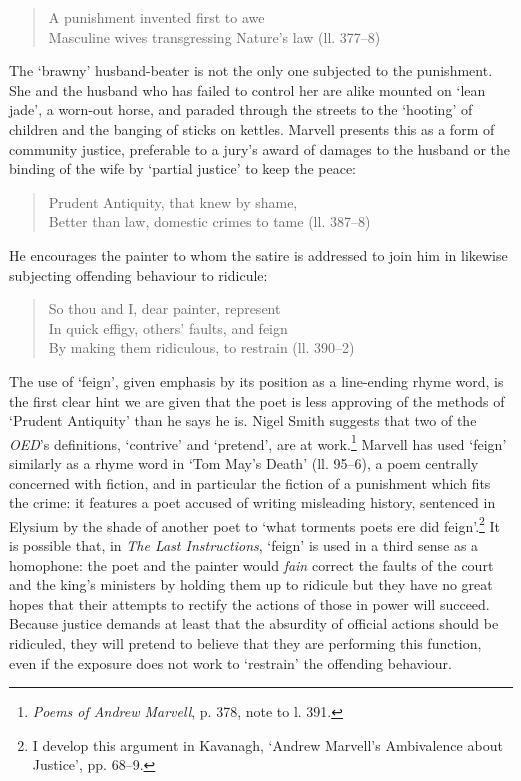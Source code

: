 ﻿\documentclass[12pt]{article}
\newcommand{\citedtitle}[1]{\textit{#1}}
\begin{document}
\begin{verse}
A punishment invented first to awe\\
Masculine wives transgressing Nature’s law (ll. 377–8)
\end{verse}

The
‘brawny’ husband-beater is not the only one subjected to the punishment. She
and the husband who has failed to control her are alike mounted on ‘lean jade’,
a worn-out horse, and paraded through the streets to the ‘hooting’ of children
and the banging of sticks on kettles. Marvell presents this as a form of
community justice, preferable to a jury’s award of damages to the husband or
the binding of the wife by ‘partial justice’ to keep the peace:

\begin{verse}
Prudent Antiquity, that knew by shame,\\
Better than law, domestic crimes to tame (ll. 387–8)
\end{verse}

He
encourages the painter to whom the satire is addressed to join him in likewise
subjecting offending behaviour to ridicule:

\begin{verse}
So thou and I, dear painter, represent\\
In quick effigy, others’ faults, and feign\\
By making them ridiculous, to restrain (ll. 390–2)
\end{verse}

The
use of ‘feign’, given emphasis by its position as a line-ending rhyme word, is
the first clear hint we are given that the poet is less approving of the
methods of ‘Prudent Antiquity’ than he says he is. Nigel Smith suggests that
two of the \citedtitle{OED}’s definitions,
‘contrive’ and ‘pretend’, are at work.\footnote{\citedtitle{Poems of Andrew Marvell}, p. 378, note to l. 391.}
Marvell has used ‘feign’ similarly as a rhyme word in ‘Tom May’s Death’ (ll.
95–6), a poem centrally concerned with fiction, and in particular the fiction
of a punishment which fits the crime: it features a poet accused of writing
misleading history, sentenced in Elysium by the shade of another poet to ‘what
torments poets ere did feign’.\footnote{I develop this argument
in Kavanagh, ‘Andrew Marvell’s Ambivalence about Justice’, pp. 68–9.}
It is possible that, in \citedtitle{The Last Instructions}, ‘feign’ is used in a
third sense as a homophone: the poet and the painter would \emph{fain}
correct the faults of
the court and the king’s ministers by holding them up to ridicule but they have
no great hopes that their attempts to rectify the actions of those in power
will succeed. Because justice demands at least that the absurdity of official
actions should be ridiculed, they will pretend to believe that they are
performing this function, even if the exposure does not work to ‘restrain’ the
offending behaviour.
\end{document}
